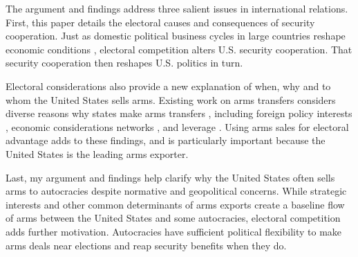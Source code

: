 \documentclass[12pt]{article}
\begin{document}


The argument and findings address three salient issues in international relations. 
First, this paper details the electoral causes and consequences of security cooperation. 
Just as domestic political business cycles in large countries reshape economic conditions \citep{Kayser2006}, electoral competition alters U.S. security cooperation. 
That security cooperation then reshapes U.S. politics in turn. 


Electoral considerations also provide a new explanation of when, why and to whom the United States sells arms. 
Existing work on arms transfers considers diverse reasons why states make arms transfers \citep{WillardsonJohnson2022}, including foreign policy interests \citep{Thralletal2020}, economic considerations \citep{Bitzinger1994} networks \citep{Thurneretal2019}, and leverage \citep{Spindel2023}. 
Using arms sales for electoral advantage adds to these findings, and is particularly important because the United States is the leading arms exporter.


Last, my argument and findings help clarify why the United States often sells arms to autocracies despite normative and geopolitical concerns. 
While strategic interests and other common determinants of arms exports create a baseline flow of arms between the United States and some autocracies, electoral competition adds further motivation. 
Autocracies have sufficient political flexibility to make arms deals near elections and reap security benefits when they do. 


\end{document}
